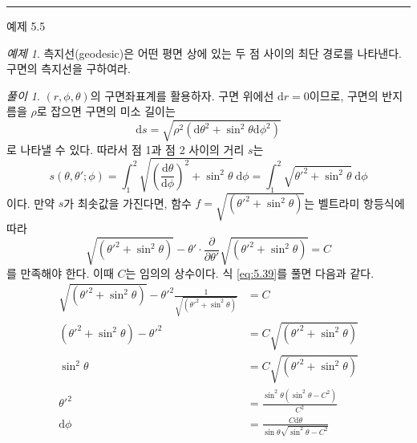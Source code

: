 \documentclass[chapter, oneside, b5paper]{oblivoir}
\theoremstyle{plain}
\theoremstyle{definition}
\theoremstyle{remark}
\newtheorem{example}{예제}[chapter]    %
\newtheorem*{solution}{풀이}
\begin{document}
\noindent\rule{\textwidth}{0.8pt} %
\vspace{1em} %

\begin{examplebox}{예제 5.5}
\begin{example}
측지선(geodesic)은 어떤 평면 상에 있는 두 점 사이의 최단 경로를 나타낸다. 구면의 측지선을 구하여라.
\end{example}
\end{examplebox}

\begin{solution}
    $(r, \phi, \theta)$의 구면좌표계를 활용하자. 구면 위에선 $\mathrm{d}r = 0$이므로, 구면의 반지름을 $\rho$로 잡으면 구면의 미소 길이는
    \begin{equation}
        \mathrm{d}s = \sqrt{\rho^2({\mathrm{d}\theta}^2 + \sin^2{\theta}{\mathrm{d}\phi}^2)}
    \end{equation}
    로 나타낼 수 있다. 따라서 점 1과 점 2 사이의 거리 $s$는
    \begin{equation}
        s(\theta, \theta' ; \phi) = \int_1^2 \sqrt{{\left( \frac{\mathrm{d}\theta}{\mathrm{d}\phi}\right)}^2 + \sin^2{\theta}} \ \mathrm{d}\phi = \int_1^2 \sqrt{{\theta'}^2 + {\sin}^2{\theta}} \ \mathrm{d}\phi 
    \end{equation}
    이다. 만약 $s$가 최솟값을 가진다면, 함수 $f = \sqrt{(\theta'^2 + \sin^2{\theta})}$는 벨트라미 항등식에 따라
    \begin{equation}
        \sqrt{({\theta'}^2 + \sin^2{\theta})} - \theta' \cdot \frac{\partial}{\partial\theta'}\sqrt{({\theta'}^2 + \sin^2{\theta})} = C
        \label{eq:5.39}
    \end{equation}
    를 만족해야 한다. 이때 $C$는 임의의 상수이다. 식 \ref{eq:5.39}를 풀면 다음과 같다.
    \begin{equation}
    \begin{aligned}
        \sqrt{({\theta'}^2 + \sin^2{\theta})} - {\theta'}^2 \frac{1}{ \sqrt{({\theta'}^2 + \sin^2{\theta})}} &= C \\
         ({\theta'}^2 + \sin^2{\theta}) - {\theta'}^2 &= C\sqrt{({\theta'}^2 + \sin^2{\theta})} \\
         \sin^2{\theta} &= C\sqrt{({\theta'}^2 + \sin^2{\theta})} \\
         {\theta'}^2 &= \frac{\sin^2{\theta}(\sin^2{\theta}-C^2)}{C^2} \\
         \mathrm{d}\phi &= \frac{C \mathrm{d}\theta}{\sin{\theta} \sqrt{\sin^2{\theta}-C^2}}

\end{aligned}
\end{equation}
\end{solution}
\end{document}
